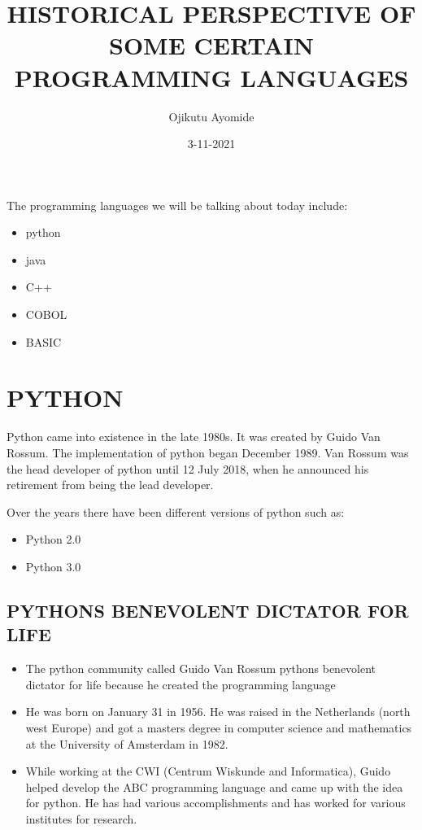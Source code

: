 \documentclass{article}
\title{HISTORICAL PERSPECTIVE OF SOME CERTAIN PROGRAMMING LANGUAGES}
\date{3-11-2021}
\author{Ojikutu Ayomide}
\begin{document}
	\maketitle
	
	
	The programming languages we will be talking about today include:
	\begin{itemize}
		\item python
		\item java
		\item C++
		\item COBOL
		\item BASIC
	\end{itemize}


	\maketitle 
	\section{PYTHON}
Python came into existence in the late 1980s. It was created by Guido Van Rossum. The implementation of python began December 1989. Van Rossum was the head developer of python until 12 July 2018, when he announced his retirement from being the lead developer.

Over the years there have been different versions of python such as:

\begin{itemize}
	\item Python 2.0
	\item Python 3.0
\end{itemize}

\subsection{PYTHONS BENEVOLENT DICTATOR FOR LIFE}
	\begin{itemize}
	\item The python community called Guido Van Rossum pythons benevolent dictator for life because he created the programming language
	
	\item He was born on January 31 in 1956. He was raised in the Netherlands (north west Europe) and got a masters degree in computer science and mathematics at the University of Amsterdam in 1982.
	
	\item While working at the CWI (Centrum Wiskunde and Informatica), Guido helped develop the ABC programming language and came up with the idea for python. He has had various accomplishments and has worked for various institutes for research. 
		\end{itemize}   
	
\end{document}
